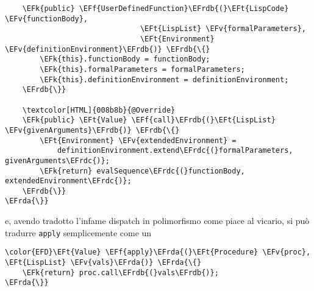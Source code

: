 \documentclass[11pt]{article}
\newcommand{\EFk}[1]{\textcolor{EFk}{#1}} %
\newcommand{\EFf}[1]{\textcolor{EFf}{#1}} %
\newcommand{\EFv}[1]{\textcolor{EFv}{#1}} %
\newcommand{\EFt}[1]{\textcolor{EFt}{#1}} %
\newcommand{\EFrda}[1]{\textcolor{EFrda}{#1}} %
\newcommand{\EFrdb}[1]{\textcolor{EFrdb}{#1}} %
\newcommand{\EFrdc}[1]{\textcolor{EFrdc}{#1}} %
\begin{document}
\begin{enumerate}
\begin{Code}
\begin{Verbatim}
    \EFk{public} \EFf{UserDefinedFunction}\EFrdb{(}\EFt{LispCode} \EFv{functionBody},
                               \EFt{LispList} \EFv{formalParameters},
                               \EFt{Environment} \EFv{definitionEnvironment}\EFrdb{)} \EFrdb{\{}
        \EFk{this}.functionBody = functionBody;
        \EFk{this}.formalParameters = formalParameters;
        \EFk{this}.definitionEnvironment = definitionEnvironment;
    \EFrdb{\}}

    \textcolor[HTML]{008b8b}{@Override}
    \EFk{public} \EFt{Value} \EFf{call}\EFrdb{(}\EFt{LispList} \EFv{givenArguments}\EFrdb{)} \EFrdb{\{}
        \EFt{Environment} \EFv{extendedEnvironment} =
            definitionEnvironment.extend\EFrdc{(}formalParameters, givenArguments\EFrdc{)};
        \EFk{return} evalSequence\EFrdc{(}functionBody, extendedEnvironment\EFrdc{)};
    \EFrdb{\}}
\EFrda{\}}
\end{Verbatim}
\end{Code}

e, avendo tradotto l'infame dispatch in polimorfismo come piace al vicario, si può tradurre \texttt{apply} semplicemente come un
\begin{Code}
\begin{Verbatim}
\color{EFD}\EFt{Value} \EFf{apply}\EFrda{(}\EFt{Procedure} \EFv{proc}, \EFt{LispList} \EFv{vals}\EFrda{)} \EFrda{\{}
    \EFk{return} proc.call\EFrdb{(}vals\EFrdb{)};
\EFrda{\}}
\end{Verbatim}
\end{Code}
\end{enumerate}
\end{document}
